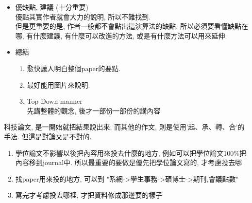 \begin{enumerate}
{\begin{itemize}
      \item
      {
        優缺點, 建議 (十分重要)\\
        優點其實作者就會大力的說明, 所以不難找到.\\
         
        但是更重要的是, 作者一般都不會點出這演算法的缺點, 所以必須要看懂缺點在哪, 有什麼建議, 有什麼可以改進的方法, 或是有什麼方法可以用來延伸.
      } %

      \item
      {
        總結
        \begin{enumerate}
          \item
          {
            愈快讓人明白整個paper的要點.
          } %

          \item
          {
            最好能用圖片來說明.
          } %

          \item
          {
            Top-Down manner\\
            先講整體的觀念, 後才一部份一部份的講內容
          } %
        \end{enumerate}
      } %
    \end{itemize}

    科技論文, 是一開始就把結果說出來; 而其他的作文, 則是使用'起、承、轉、合'的手法. 但這是對論文是不對的.
  } %
\end{enumerate}


\begin{enumerate}
  \item
  {
    學位論文不影響以後把內容用來投去什麼的地方, 例如可以把學位論文100\%把內容移到journal中. 所以最重要的要做是優先把學位論文寫的, 才考慮投去哪
  } %

  \item
  {
    找paper用來投的地方, 可以到 "系網->學生事務->碩博士->期刊,會議點數"
  } %

  \item
  {
    寫完才考慮投去哪裡, 才把資料修成那邊要的樣子
  } %
\end{enumerate}

